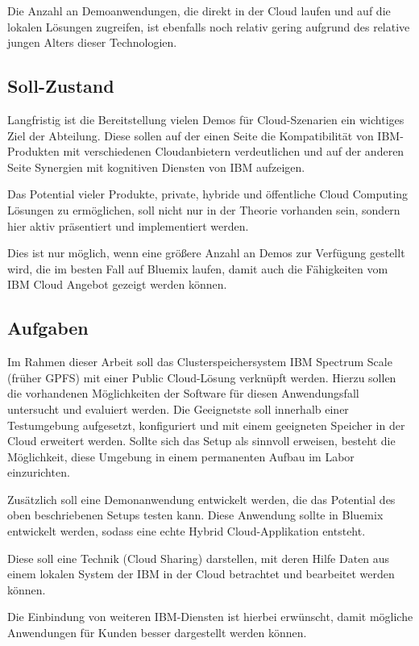 Die Anzahl an Demoanwendungen, die direkt in der Cloud laufen und auf die lokalen Lösungen zugreifen, ist ebenfalls noch relativ gering aufgrund des relative jungen Alters dieser Technologien.

\subsection{Soll-Zustand}

Langfristig ist die Bereitstellung vielen Demos für Cloud-Szenarien ein wichtiges Ziel der Abteilung. Diese sollen auf der einen Seite die Kompatibilität von IBM-Produkten mit verschiedenen Cloudanbietern verdeutlichen und auf der anderen Seite Synergien mit kognitiven Diensten von IBM aufzeigen.

Das Potential vieler Produkte, private, hybride und öffentliche Cloud Computing Lösungen zu ermöglichen, soll nicht nur in der Theorie vorhanden sein, sondern hier aktiv präsentiert und implementiert werden.

Dies ist nur möglich, wenn eine größere Anzahl an Demos zur Verfügung gestellt wird, die im besten Fall auf \gls{Bluemix} laufen, damit auch die Fähigkeiten vom IBM Cloud Angebot gezeigt werden können. 

\subsection{Aufgaben}

Im Rahmen dieser Arbeit soll das Clusterspeichersystem IBM Spectrum Scale (früher GPFS) mit einer Public Cloud-Lösung verknüpft werden. Hierzu sollen die vorhandenen Möglichkeiten der Software für diesen Anwendungsfall untersucht und evaluiert werden.
Die Geeignetste soll innerhalb einer Testumgebung aufgesetzt, konfiguriert und mit einem geeigneten Speicher in der Cloud erweitert werden. 
Sollte sich das Setup als sinnvoll erweisen, besteht die Möglichkeit, diese Umgebung in einem permanenten Aufbau im Labor einzurichten.

Zusätzlich soll eine Demonanwendung entwickelt werden, die das Potential des oben beschriebenen Setups testen kann. Diese Anwendung sollte in \gls{Bluemix} entwickelt werden, sodass eine echte Hybrid Cloud-Applikation entsteht. 

Diese soll eine Technik (Cloud Sharing) darstellen, mit deren Hilfe Daten aus einem lokalen System der IBM in der Cloud betrachtet und bearbeitet werden können.

Die Einbindung von weiteren IBM-Diensten ist hierbei erwünscht, damit mögliche Anwendungen für Kunden besser dargestellt werden können.


